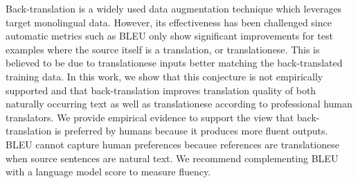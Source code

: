 Back-translation is a widely used data augmentation technique which leverages target monolingual data. However, its effectiveness has been challenged since automatic metrics such as BLEU only show significant improvements for test examples where the source itself is a translation, or translationese. This is believed to be due to translationese inputs better matching the back-translated training data. In this work, we show that this conjecture is not empirically supported and that back-translation improves translation quality of both naturally occurring text as well as translationese according to professional human translators. We provide empirical evidence to support the view that back-translation is preferred by humans because it produces more fluent outputs.  BLEU cannot capture human preferences because references are translationese when source sentences are natural text.  We recommend complementing BLEU with a language model score to measure fluency.
